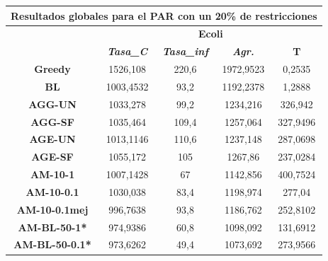 \documentclass[12pt, spanish]{article}
\begin{document}
\begin{table}[H]
\centering
\begin{tabular}{|c|c|c|c|c|}
\hline
\multicolumn{5}{|c|}{\textbf{Resultados globales para el PAR con un 20\% de restricciones}}                                 \\ \hline
\multirow{2}{*}{}           & \multicolumn{4}{c|}{\textbf{Ecoli}}                                                           \\ \cline{2-5} 
                            & \textit{\textbf{Tasa\_C}} & \textit{\textbf{Tasa\_inf}} & \textit{\textbf{Agr.}} & \textbf{T} \\ \hline
\textbf{Greedy}             & 1526,108                  & 220,6                       & 1972,9523              & 0,2535     \\ \hline
\textbf{BL}                 & 1003,4532                 & 93,2                        & 1192,2378              & 1,2888     \\ \hline
\textbf{AGG-UN}             & 1033,278                  & 99,2                        & 1234,216               & 326,942    \\ \hline
\textbf{AGG-SF}             & 1035,464                  & 109,4                       & 1257,064               & 327,9496   \\ \hline
\textbf{AGE-UN}             & 1013,1146                 & 110,6                       & 1237,148               & 287,0698   \\ \hline
\textbf{AGE-SF}             & 1055,172                  & 105                         & 1267,86                & 237,0284   \\ \hline
\textbf{AM-10-1}            & 1007,1428                 & 67                          & 1142,856               & 400,7524   \\ \hline
\textbf{AM-10-0.1}          & 1030,038                  & 83,4                        & 1198,974               & 277,04     \\ \hline
\textbf{AM-10-0.1mej}       & 996,7638                  & 93,8                        & 1186,762               & 252,8102   \\ \hline
\textbf{AM-BL-50-1*}        & 974,9386                  & 60,8                        & 1098,092               & 131,6912   \\ \hline
\textbf{AM-BL-50-0.1*}      & 973,6262                  & 49,4                        & 1073,692               & 273,9566   \\ \hline

\end{tabular}
\end{table}
\end{document}
